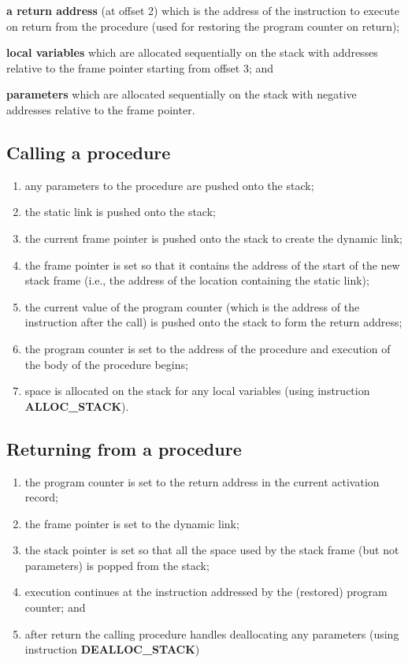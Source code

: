 \documentclass[fontsize=10pt,a4paper]{article}
\begin{document}
\begin{multicols}{3}
    \textbf{a return address} (at offset 2) which is the address of the instruction to execute on return from the procedure (used for restoring the program counter on return);

    \textbf{local variables} which are allocated sequentially on the stack with addresses relative to the frame pointer starting from offset 3; and

    \textbf{parameters} which are allocated sequentially on the stack with negative addresses relative to the frame pointer.

    \subsection{Calling a procedure}

    \begin{enumerate}
        \item any parameters to the procedure are pushed onto the stack;
        \item the static link is pushed onto the stack;
        \item the current frame pointer is pushed onto the stack to create the dynamic link;
        \item the frame pointer is set so that it contains the address of the start of the new stack frame (i.e., the address of the location containing the static link);
        \item the current value of the program counter (which is the address of the instruction after the call) is pushed onto the stack to form the return address;
        \item the program counter is set to the address of the procedure and execution of the body of the procedure begins;
        \item space is allocated on the stack for any local variables (using instruction \textbf{ALLOC\_STACK}).
    \end{enumerate}

    \subsection{Returning from a procedure}

    \begin{enumerate}
        \item the program counter is set to the return address in the current activation record;
        \item the frame pointer is set to the dynamic link;
        \item the stack pointer is set so that all the space used by the stack frame (but not parameters) is popped from the stack;
        \item execution continues at the instruction addressed by the (restored) program counter; and
        \item after return the calling procedure handles deallocating any parameters (using instruction \textbf{DEALLOC\_STACK})
    \end{enumerate}


\end{multicols}
\end{document}
